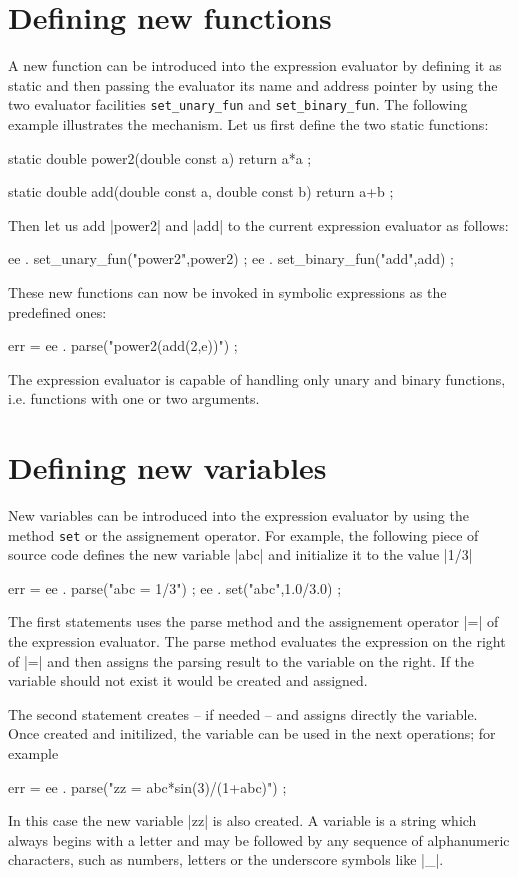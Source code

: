 \documentclass[12pt]{article}
\newcommand{\METHOD}[1]{\texttt{\color{blue}#1}}
\renewcommand{\verb}{\SaveVerb[aftersave=\texttt{\color{red}\UseVerb{verb}}]{verb}}
\begin{document}
\section{Defining new functions}
A new function can be introduced into the expression
evaluator by defining it as static and then 
passing the evaluator its name and address pointer
by using the two evaluator facilities \METHOD{set\_unary\_fun} 
and \METHOD{set\_binary\_fun}. 
The following example illustrates the mechanism. Let us first
define the two static functions:
\begin{code}
  static double power2(double const a)
  { return a*a ; }
  
  static double add(double const a, double const b)
  { return a+b ; }
\end{code}
Then let us add \verb|power2| and \verb|add| to the current
expression evaluator as follows:
\begin{code}
  ee . set_unary_fun("power2",power2) ;
  ee . set_binary_fun("add",add) ;
\end{code}
These new functions can now be invoked in symbolic expressions 
as the predefined ones:
\begin{code}
  err = ee . parse("power2(add(2,e))") ;
\end{code}
The expression evaluator is capable of handling only unary and 
binary functions, i.e. functions with one or two arguments.

\section{Defining new variables}
New variables can be introduced into the expression evaluator by using
the method \METHOD{set} or the assignement operator.
For example, the following piece of source code defines the new variable 
\verb|abc| and initialize it to the value \verb|1/3| 
\begin{code}
  err = ee . parse("abc = 1/3") ;
  ee . set("abc",1.0/3.0) ;
\end{code}
The first statements uses the parse method and the assignement operator
\verb|=| of the expression evaluator. The parse method evaluates the 
expression on the right of \verb|=| and then assigns the parsing result 
to the variable on the right. 
If the variable should not exist it would be created and assigned.

The second statement creates -- if needed -- and assigns directly the 
variable. Once created and initilized, the variable can be used in 
the next operations; for example
\begin{code}
  err = ee . parse("zz = abc*sin(3)/(1+abc)") ;
\end{code}
In this case the new variable \verb|zz| is also created.
A variable is a string which always begins with a letter and may be
followed by any sequence of alphanumeric characters, such as numbers, letters or 
the underscore symbols like \verb|_|.  
\end{document}
